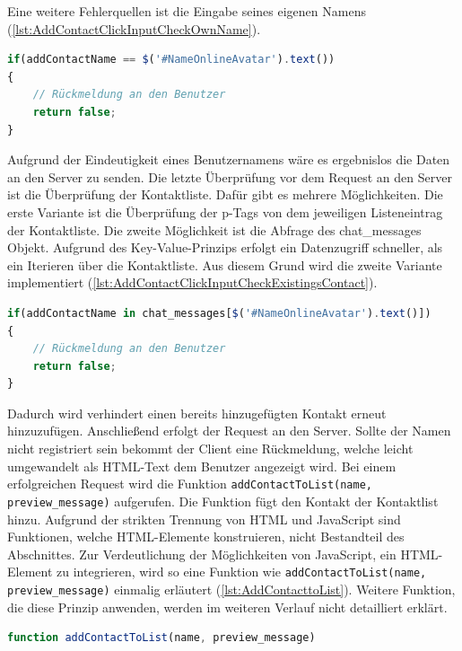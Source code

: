 \documentclass[a4paper,titlepage,halfparskip,12pt]{scrreprt}
\begin{document}
\begin{onehalfspacing}
\pagebreak

Eine weitere Fehlerquellen ist die Eingabe seines eigenen Namens (\autoref{lst:AddContactClickInputCheckOwnName}).
\begin{lstlisting}[language=Javascript,caption=Überprüfung der Eingabe auf eigenen Namen,label={lst:AddContactClickInputCheckOwnName}]
if(addContactName == $('#NameOnlineAvatar').text())
{
	// Rückmeldung an den Benutzer
	return false;
}
\end{lstlisting} 
Aufgrund der Eindeutigkeit eines Benutzernamens wäre es ergebnislos die Daten an den Server zu senden. Die letzte Überprüfung vor dem Request an den Server ist die Überprüfung der Kontaktliste. Dafür gibt es mehrere Möglichkeiten. Die erste Variante ist die Überprüfung der p-Tags von dem jeweiligen Listeneintrag der Kontaktliste. Die zweite Möglichkeit ist die Abfrage des chat\_messages Objekt. Aufgrund des Key-Value-Prinzips erfolgt ein Datenzugriff schneller, als ein Iterieren über die Kontaktliste. Aus diesem Grund wird die zweite Variante implementiert (\autoref{lst:AddContactClickInputCheckExistingsContact}).
\begin{lstlisting}[language=Javascript,caption=Überprüfung der Eingabe einen bereits vorhandenen Kontakt,label={lst:AddContactClickInputCheckExistingsContact}]
if(addContactName in chat_messages[$('#NameOnlineAvatar').text()])
{
	// Rückmeldung an den Benutzer
	return false;
}
\end{lstlisting} 
Dadurch wird verhindert einen bereits hinzugefügten Kontakt erneut hinzuzufügen. Anschließend erfolgt der Request an den Server. Sollte der Namen nicht registriert sein bekommt der Client eine Rückmeldung, welche leicht umgewandelt als \ac{HTML}-Text dem Benutzer angezeigt wird. Bei einem erfolgreichen Request wird die Funktion \texttt{addContactToList(name, preview\_message)} aufgerufen. Die Funktion fügt den Kontakt der Kontaktlist hinzu. Aufgrund der strikten Trennung von HTML und JavaScript sind Funktionen, welche HTML-Elemente konstruieren, nicht Bestandteil des Abschnittes. Zur Verdeutlichung der Möglichkeiten von JavaScript, ein HTML-Element zu integrieren, wird so eine Funktion wie \texttt{addContactToList(name, preview\_message)} einmalig erläutert (\autoref{lst:AddContacttoList}). Weitere Funktion, die diese Prinzip anwenden, werden im weiteren Verlauf nicht detailliert erklärt.
\begin{lstlisting}[language=Javascript,caption=Hinzufügen des Kontaktes mithilfe von HTML-Elementen,label={lst:AddContacttoList}]
function addContactToList(name, preview_message)

\end{lstlisting}
\end{onehalfspacing}
\end{document}

